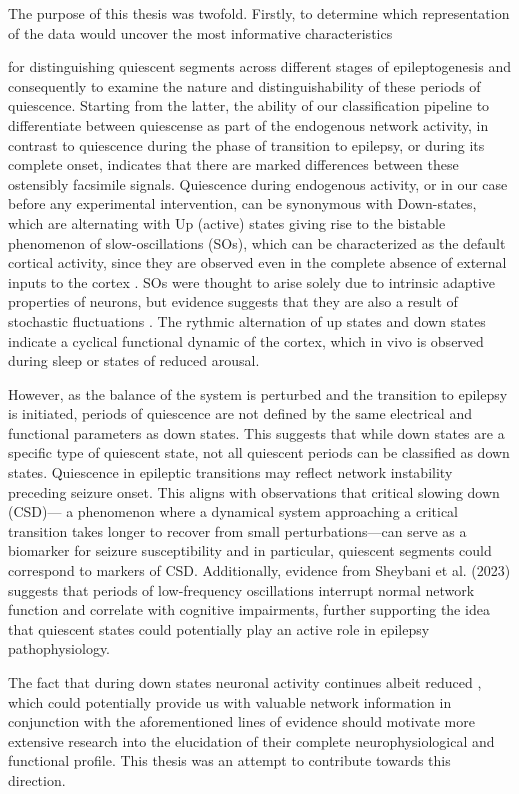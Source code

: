 \documentclass{article}
\begin{document}
The purpose of this thesis was twofold. Firstly, to determine which representation of the data would uncover the most informative characteristics {for distinguishing quiescent segments across different stages of epileptogenesis and consequently to examine the nature and distinguishability of these periods of quiescence. Starting from the latter, the ability of our classification pipeline to differentiate between quiescense as part of the endogenous network activity, in contrast to quiescence during the phase of transition to epilepsy, or during its complete onset, indicates that there are marked differences between these ostensibly facsimile signals. Quiescence during endogenous activity, or in our case before any experimental intervention, can be synonymous with Down-states, which are alternating with Up (active) states giving rise to the bistable phenomenon of slow-oscillations (SOs), which can be characterized as the default cortical activity, since they are observed even in the complete absence of external inputs to the cortex \cite{sanchez2017}. SOs were thought to arise solely due to intrinsic adaptive properties of neurons, but evidence suggests that they are also a result of stochastic fluctuations \cite{jercog2017}. The rythmic alternation of up states and down states indicate a cyclical functional dynamic of the cortex, which in vivo is observed during sleep or states of reduced arousal.

However, as the balance of the system is perturbed and the transition to epilepsy is initiated, periods of quiescence are not defined by the same electrical and functional parameters as down states. This suggests that while down states are a specific type of quiescent state, not all quiescent periods can be classified as down states.  Quiescence in epileptic transitions may reflect network instability preceding seizure onset. This aligns with observations that critical slowing down (CSD)— a phenomenon where a dynamical system approaching a critical transition takes longer to recover from small perturbations—can serve as a biomarker for seizure susceptibility \cite{maturana2020} and in particular, quiescent segments could correspond to markers of CSD. Additionally, evidence from Sheybani et al. (2023) \cite{sheybani2023} suggests that periods of low-frequency oscillations interrupt normal network function and correlate with cognitive impairments, further supporting the idea that quiescent states could potentially play an active role in epilepsy pathophysiology.

The fact that during down states neuronal activity continues albeit reduced \cite{reig2010}, which could potentially provide us with valuable network information in conjunction with the aforementioned lines of evidence should motivate more extensive research into the elucidation of their complete neurophysiological and functional profile. This thesis was an attempt to contribute towards this direction.

}
\end{document}
